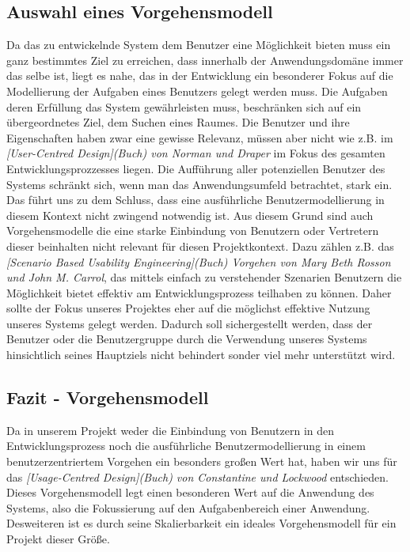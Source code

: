 \subsection{Auswahl eines Vorgehensmodell}
\label{sec:Auswahl eines Vorgehensmodell}
Da das zu entwickelnde System dem Benutzer eine Möglichkeit bieten muss ein
ganz bestimmtes Ziel zu erreichen, dass innerhalb der Anwendungsdomäne immer
das selbe ist, liegt es nahe, das in der Entwicklung ein besonderer Fokus auf
die Modellierung der Aufgaben eines Benutzers gelegt werden muss. Die Aufgaben
deren Erfüllung das System gewährleisten muss, beschränken sich auf ein
übergeordnetes Ziel, dem Suchen eines Raumes. Die Benutzer und ihre
Eigenschaften haben zwar eine gewisse Relevanz, müssen aber nicht wie z.B. im
\textit{[User-Centred Design](Buch) von Norman und Draper} im Fokus des gesamten
Entwicklungsprozzesses liegen. Die Aufführung aller potenziellen Benutzer des
Systems schränkt sich, wenn man das Anwendungsumfeld betrachtet, stark ein.
Das führt uns zu dem Schluss, dass eine ausführliche Benutzermodellierung in
diesem Kontext nicht zwingend notwendig ist. Aus diesem Grund sind auch
Vorgehensmodelle die eine starke Einbindung von Benutzern oder Vertretern
dieser beinhalten nicht relevant für diesen Projektkontext.
Dazu zählen z.B. das \textit{[Scenario Based Usability Engineering](Buch) Vorgehen von Mary Beth Rosson und John M. Carrol},
das mittels einfach zu verstehender Szenarien Benutzern die Möglichkeit bietet
effektiv am Entwicklungsprozess teilhaben zu können. Daher sollte der Fokus
unseres Projektes eher auf die möglichst effektive Nutzung unseres Systems
gelegt werden. Dadurch soll sichergestellt werden, dass der Benutzer oder die
Benutzergruppe durch die Verwendung unseres Systems hinsichtlich seines
Hauptziels nicht behindert sonder viel mehr unterstützt wird.

\subsection{Fazit - Vorgehensmodell}
\label{sec:Fazit - Vorgehensmodell}

Da in unserem Projekt weder die Einbindung von Benutzern in den
Entwicklungsprozess noch die ausführliche Benutzermodellierung in einem
benutzerzentriertem Vorgehen ein besonders großen Wert hat, haben wir uns für
das \textit{[Usage-Centred Design](Buch) von Constantine und Lockwood}
entschieden. Dieses Vorgehensmodell legt einen besonderen Wert auf die
Anwendung des Systems, also die Fokussierung auf den Aufgabenbereich einer
Anwendung. Desweiteren ist es durch seine Skalierbarkeit ein ideales
Vorgehensmodell für ein Projekt dieser Größe.

